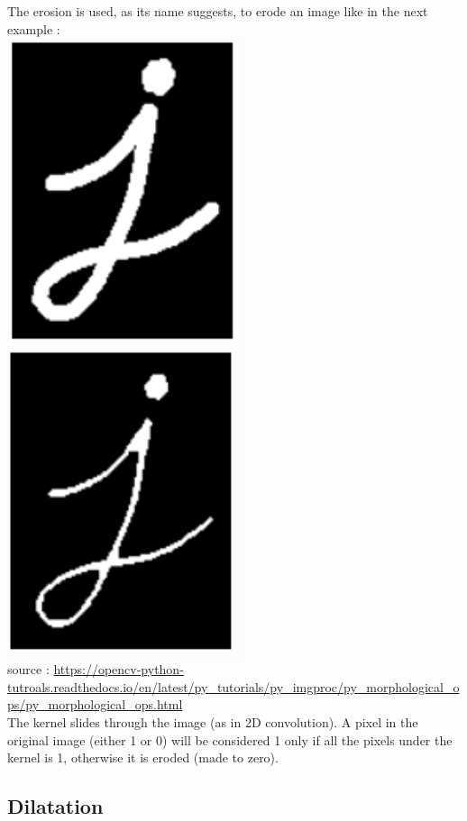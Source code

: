 \documentclass{article}
\begin{document}
The erosion is used, as its name suggests, to erode an image like in the next example :\\

\includegraphics[width=6.8cm]{images/img12.png} 
\includegraphics[width=6.8cm]{images/img13.png} \\
source : \url{https://opencv-python-tutroals.readthedocs.io/en/latest/py_tutorials/py_imgproc/py_morphological_ops/py_morphological_ops.html}\\

The kernel slides through the image (as in 2D convolution). A pixel in the original image (either 1 or 0) will be considered 1 only if all the pixels under the kernel is 1, otherwise it is eroded (made to zero).

\subsection{Dilatation}
\end{document}
